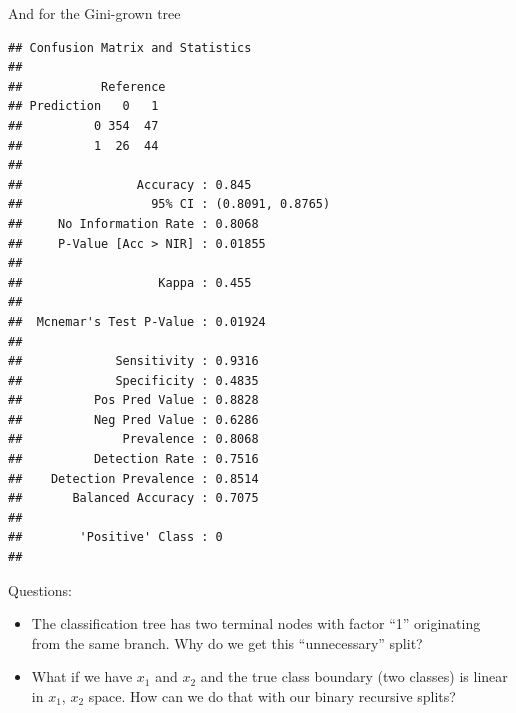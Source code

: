 \documentclass[10pt,ignorenonframetext,]{beamer}
\newenvironment{Shaded}{\begin{snugshade}}{\end{snugshade}}
\newcommand{\KeywordTok}[1]{\textcolor[rgb]{0.13,0.29,0.53}{\textbf{#1}}}
\newcommand{\DataTypeTok}[1]{\textcolor[rgb]{0.13,0.29,0.53}{#1}}
\newcommand{\StringTok}[1]{\textcolor[rgb]{0.31,0.60,0.02}{#1}}
\newcommand{\OperatorTok}[1]{\textcolor[rgb]{0.81,0.36,0.00}{\textbf{#1}}}
\newcommand{\NormalTok}[1]{#1}
\providecommand{\tightlist}{%
  \setlength{\itemsep}{0pt}\setlength{\parskip}{0pt}}
\begin{document}
\begin{frame}[fragile]

And for the Gini-grown tree

\footnotesize

\begin{Shaded}
\end{Shaded}

\begin{verbatim}
## Confusion Matrix and Statistics
## 
##           Reference
## Prediction   0   1
##          0 354  47
##          1  26  44
##                                           
##                Accuracy : 0.845           
##                  95% CI : (0.8091, 0.8765)
##     No Information Rate : 0.8068          
##     P-Value [Acc > NIR] : 0.01855         
##                                           
##                   Kappa : 0.455           
##                                           
##  Mcnemar's Test P-Value : 0.01924         
##                                           
##             Sensitivity : 0.9316          
##             Specificity : 0.4835          
##          Pos Pred Value : 0.8828          
##          Neg Pred Value : 0.6286          
##              Prevalence : 0.8068          
##          Detection Rate : 0.7516          
##    Detection Prevalence : 0.8514          
##       Balanced Accuracy : 0.7075          
##                                           
##        'Positive' Class : 0               
## 
\end{verbatim}

\normalsize

\end{frame}

\begin{frame}

\begin{block}{Questions:}

\begin{itemize}
\tightlist
\item
  The classification tree has two terminal nodes with factor ``1''
  originating from the same branch. Why do we get this ``unnecessary''
  split?
\item
  What if we have \(x_1\) and \(x_2\) and the true class boundary (two
  classes) is linear in \(x_1\), \(x_2\) space. How can we do that with
  our binary recursive splits?
\end{itemize}

\end{block}

\end{frame}
\end{document}
